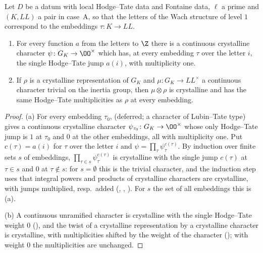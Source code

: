 \begin{proposition}\label{pf:linkN-sel:crychar}
Let $D$ be a datum with local Hodge--Tate data and Fontaine data, $\ell$ a prime and $(K,\mathit{LL})$ a pair in case~A, so that the letters of the
Wach structure of level $1$ correspond to the embeddings $\tau\colon K\to\mathit{LL}$.
\begin{enumerate}[label=(\alph*)]
\item For every function $a$ from the letters to $\Z$ there is a continuous crystalline character $\psi\colon G_K\to\OO^\times$ which has, at every
embedding $\tau$ over the letter $i$, the single Hodge--Tate jump $a(i)$, with multiplicity one.
\item If $\rho$ is a crystalline representation of $G_K$ and $\mu\colon G_K\to\mathit{LL}^\times$ a continuous character trivial on the inertia group,
then $\mu\otimes\rho$ is crystalline and has the same Hodge--Tate multiplicities as $\rho$ at every embedding.
\end{enumerate}
\end{proposition}

\begin{proof}
(a) For every embedding $\tau_0$,  (deferred; a character of Lubin--Tate type) gives a continuous crystalline character $\psi_{\tau_0}\colon G_K\to\OO^\times$ whose only Hodge--Tate jump is $1$
at $\tau_0$ and $0$ at the other embeddings, all with multiplicity one. Put $c(\tau)=a(i)$ for $\tau$ over the letter $i$ and
$\psi=\prod_\tau\psi_\tau^{c(\tau)}$. By induction over finite sets $s$ of embeddings, $\prod_{\tau\in s}\psi_\tau^{c(\tau)}$ is crystalline with the
single jump $c(\tau)$ at $\tau\in s$ and $0$ at $\tau\notin s$: for $s=\emptyset$ this is the trivial character, and the induction step uses that
integral powers and products of crystalline characters are crystalline, with jumps multiplied, resp.\ added
(, ,
). For $s$ the set of all embeddings this is (a).

(b) A continuous unramified character is crystalline with the single Hodge--Tate weight $0$
(), and the twist of a crystalline representation by a crystalline
character is crystalline, with multiplicities shifted by the weight of the character
(); with weight $0$ the multiplicities are unchanged.
\end{proof}
